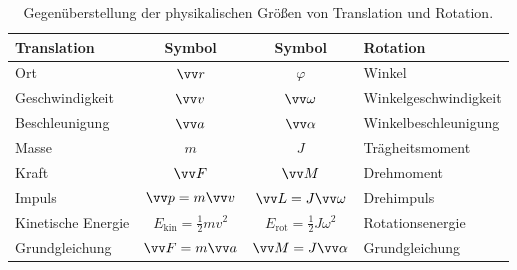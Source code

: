 \begin{table}[ht]
    \centering
    \renewcommand{\arraystretch}{1.5}
    \begin{tabularx}{0.9\textwidth}{Xc|cX}
        \toprule
        \textbf{Translation} & \textbf{Symbol} & \textbf{Symbol} & \textbf{Rotation} \\
        \midrule
        Ort & $\ivec{r}$ & $\varphi$ & Winkel \\
        Geschwindigkeit & $\ivec{v}$ & $\ivec{\omega}$ & Winkelgeschwindigkeit \\
        Beschleunigung & $\ivec{a}$ & $\ivec{\alpha}$ & Winkelbeschleunigung \\
        Masse & $m$ & $J$ & Trägheitsmoment \\
        Kraft & $\ivec{F}$ & $\ivec{M}$ & Drehmoment \\
        Impuls & $\ivec{p} = m\ivec{v}$ & $\ivec{L} = J\ivec{\omega}$ & Drehimpuls \\
        Kinetische Energie & $E_{\text{kin}} = \frac{1}{2}mv^2$ & $E_{\text{rot}} = \frac{1}{2}J\omega^2$ & Rotationsenergie \\
        Grundgleichung & $\ivec{F} = m\ivec{a}$ & $\ivec{M} = J\ivec{\alpha}$ & Grundgleichung \\
        \bottomrule
    \end{tabularx}
    \caption{Gegenüberstellung der physikalischen Größen von Translation und Rotation.}\label{tab: analogie_translation_rotation}
\end{table}

